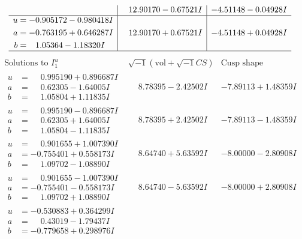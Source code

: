 \documentclass[1p]{elsarticle_modified}
\theoremstyle{definition}
\newcommand{\I}{\sqrt{-1}}
\begin{document}
$$\begin{array}{c|c|c}
 & \phantom{-}12.90170 - 0.67521 I & -4.51148 - 0.04928 I \\ \hline\begin{aligned}
u &= -0.905172 - 0.980418 I \\
a &= -0.763195 + 0.646287 I \\
b &= \phantom{-}1.05364 - 1.18320 I\end{aligned}
 & \phantom{-}12.90170 + 0.67521 I & -4.51148 + 0.04928 I\\
 \hline 
 \end{array}$$\newpage$$\begin{array}{c|c|c}  
\text{Solutions to }I^u_{1}& \I (\text{vol} + \sqrt{-1}CS) & \text{Cusp shape}\\
 \hline 
\begin{aligned}
u &= \phantom{-}0.995190 + 0.896687 I \\
a &= \phantom{-}0.62305 - 1.64005 I \\
b &= \phantom{-}1.05804 + 1.11835 I\end{aligned}
 & \phantom{-}8.78395 - 2.42502 I & -7.89113 + 1.48359 I \\ \hline\begin{aligned}
u &= \phantom{-}0.995190 - 0.896687 I \\
a &= \phantom{-}0.62305 + 1.64005 I \\
b &= \phantom{-}1.05804 - 1.11835 I\end{aligned}
 & \phantom{-}8.78395 + 2.42502 I & -7.89113 - 1.48359 I \\ \hline\begin{aligned}
u &= \phantom{-}0.901655 + 1.007390 I \\
a &= -0.755401 + 0.558173 I \\
b &= \phantom{-}1.09702 - 1.08890 I\end{aligned}
 & \phantom{-}8.64740 + 5.63592 I & -8.00000 - 2.80908 I \\ \hline\begin{aligned}
u &= \phantom{-}0.901655 - 1.007390 I \\
a &= -0.755401 - 0.558173 I \\
b &= \phantom{-}1.09702 + 1.08890 I\end{aligned}
 & \phantom{-}8.64740 - 5.63592 I & -8.00000 + 2.80908 I \\ \hline\begin{aligned}
u &= -0.530883 + 0.364299 I \\
a &= \phantom{-}0.43019 - 1.79437 I \\
b &= -0.779658 + 0.298976 I\end{aligned}

\end{array}$$
\end{document}
